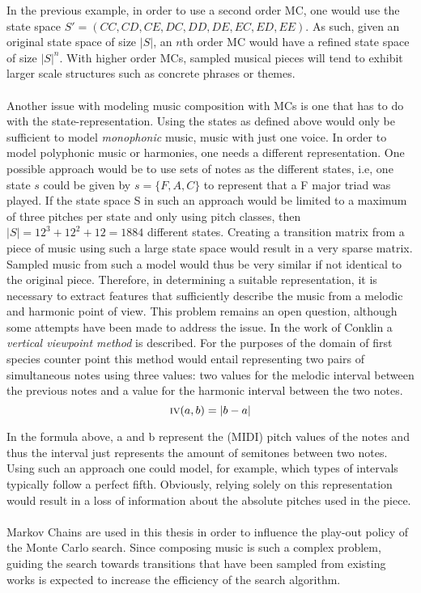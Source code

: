 \documentclass[master.tex]{subfiles}
\begin{document}
 In the previous example, in order to use a second order MC, one would use the state space $S' = ( CC, CD, CE, DC, DD, DE, EC, ED, EE)$. As such, given an original state space of size $|S|$, an $n$th order MC would have a refined state space of size $|S|^{n}$. With higher order MCs, sampled musical pieces will tend to exhibit larger scale structures such as concrete phrases or themes. 
\\
\\
Another issue with modeling music composition with MCs is one that has to do with the state-representation. Using the states as defined above would only be sufficient to model \emph{monophonic} music, music with just one voice. In order to model polyphonic music or harmonies, one needs a different representation. One possible approach would be to use sets of notes as the different states, i.e, one state $s$ could be given by $s = \{F, A, C\}$ to represent that a F major triad was played. If the state space S in such an approach would be limited to a maximum of three pitches per state and only using pitch classes, then $|S| = 12^3 + 12^2 + 12 = 1884$ different states. Creating a transition matrix from a piece of music using such a large state space would result in a very sparse matrix. Sampled music from such a model would thus be very similar if not identical to the original piece. Therefore, in determining a suitable representation, it is necessary to extract features that sufficiently describe the music from a melodic and harmonic point of view. This problem remains an open question, although some attempts have been made to address the issue. In the work of Conklin  a \emph{vertical viewpoint method} is described. For the purposes of the domain of first species counter point this method would entail representing two pairs of simultaneous notes using three values: two values for the melodic interval between the previous notes and a value for the harmonic interval between the two notes. 
\begin{equation}
\textsc{iv}(a, b) = |b - a|
\end{equation}

In the formula above, a and b represent the (MIDI) pitch values of the notes and thus the interval just represents the amount of semitones between two notes. Using such an approach one could model, for example, which types of intervals typically follow a perfect fifth. Obviously, relying solely on this representation would result in a loss of information about the absolute pitches used in the piece. 
\\
\\
Markov Chains are used in this thesis in order to influence the play-out policy of the Monte Carlo search. Since composing music is such a complex problem, guiding the search towards transitions that have been sampled from existing works is expected to increase the efficiency of the search algorithm. 
\end{document}
